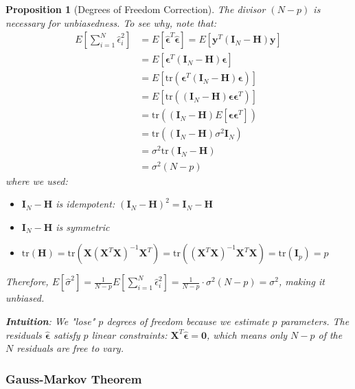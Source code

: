 \documentclass{article}
\newtheorem{proposition}{Proposition}
\begin{document}
\begin{proposition}[Degrees of Freedom Correction]
The divisor $(N-p)$ is necessary for unbiasedness. To see why, note that:
\begin{align}
E\left[\sum_{i=1}^N \hat{\epsilon}_i^2\right] &= E[\hat{\boldsymbol{\epsilon}}^T\hat{\boldsymbol{\epsilon}}] = E[\mathbf{y}^T(\mathbf{I}_N - \mathbf{H})\mathbf{y}] \\
&= E[\boldsymbol{\epsilon}^T(\mathbf{I}_N - \mathbf{H})\boldsymbol{\epsilon}] \\
&= E[\text{tr}(\boldsymbol{\epsilon}^T(\mathbf{I}_N - \mathbf{H})\boldsymbol{\epsilon})] \\
&= E[\text{tr}((\mathbf{I}_N - \mathbf{H})\boldsymbol{\epsilon}\boldsymbol{\epsilon}^T)] \\
&= \text{tr}((\mathbf{I}_N - \mathbf{H})E[\boldsymbol{\epsilon}\boldsymbol{\epsilon}^T]) \\
&= \text{tr}((\mathbf{I}_N - \mathbf{H})\sigma^2\mathbf{I}_N) \\
&= \sigma^2\text{tr}(\mathbf{I}_N - \mathbf{H}) \\
&= \sigma^2(N - p)
\end{align}
where we used:
\begin{itemize}
    \item $\mathbf{I}_N - \mathbf{H}$ is idempotent: $(\mathbf{I}_N - \mathbf{H})^2 = \mathbf{I}_N - \mathbf{H}$
    \item $\mathbf{I}_N - \mathbf{H}$ is symmetric
    \item $\text{tr}(\mathbf{H}) = \text{tr}(\mathbf{X}(\mathbf{X}^T\mathbf{X})^{-1}\mathbf{X}^T) = \text{tr}((\mathbf{X}^T\mathbf{X})^{-1}\mathbf{X}^T\mathbf{X}) = \text{tr}(\mathbf{I}_p) = p$
\end{itemize}

Therefore, $E[\hat{\sigma}^2] = \frac{1}{N-p}E[\sum_{i=1}^N \hat{\epsilon}_i^2] = \frac{1}{N-p} \cdot \sigma^2(N-p) = \sigma^2$, making it unbiased.

\textbf{Intuition}: We "lose" $p$ degrees of freedom because we estimate $p$ parameters. The residuals $\hat{\boldsymbol{\epsilon}}$ satisfy $p$ linear constraints: $\mathbf{X}^T\hat{\boldsymbol{\epsilon}} = \mathbf{0}$, which means only $N-p$ of the $N$ residuals are free to vary.
\end{proposition}

\subsubsection{Gauss-Markov Theorem}
\end{document}
